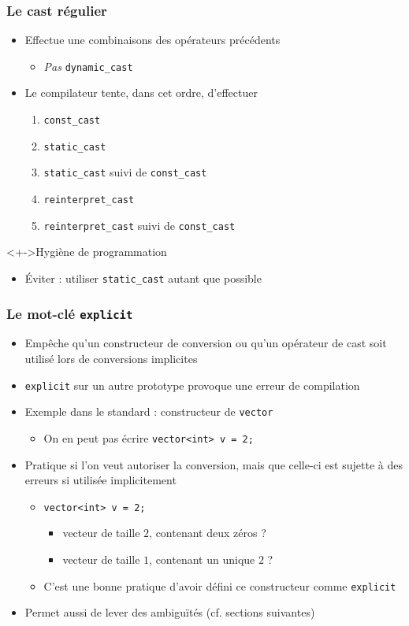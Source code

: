 \begin{frame}
\frametitle{Le cast régulier}
\begin{itemize}[<+->]
\item Effectue une combinaisons des opérateurs précédents
	\begin{itemize}
	\item \emph{Pas} \lstinline|dynamic_cast|
	\end{itemize}
\item Le compilateur tente, dans cet ordre, d'effectuer
	\begin{enumerate}
	\item \lstinline|const_cast|
	\item \lstinline|static_cast|
	\item \lstinline|static_cast| suivi de \lstinline|const_cast|
	\item \lstinline|reinterpret_cast|
	\item \lstinline|reinterpret_cast| suivi de \lstinline|const_cast|
	\end{enumerate}
\end{itemize}
\begin{block}<+->{Hygiène de programmation}
	\begin{itemize}
	\item Éviter : utiliser \lstinline|static_cast| autant que possible
	\end{itemize}
\end{block}
\end{frame}

\begin{frame}
\frametitle{Le mot-clé \texttt{explicit}}
\begin{itemize}[<+->]
\item Empêche qu'un constructeur de conversion ou qu'un opérateur de cast soit utilisé lors de conversions implicites
\item \lstinline|explicit| sur un autre prototype provoque une erreur de compilation
\item Exemple dans le standard : constructeur de \texttt{vector}
	\begin{itemize}
	\item On en peut pas écrire \lstinline|vector<int> v = 2;|
	\end{itemize}
\item Pratique si l'on veut autoriser la conversion, mais que celle-ci est sujette à des erreurs si utilisée implicitement
	\begin{itemize}
	\item \lstinline|vector<int> v = 2;|
		\begin{itemize}
		\item vecteur de taille $2$, contenant deux zéros ?
		\item vecteur de taille $1$, contenant un unique $2$ ?
		\end{itemize}
	\item C'est une bonne pratique d'avoir défini ce constructeur comme \lstinline|explicit|
	\end{itemize}
\item Permet aussi de lever des ambiguïtés (cf. sections suivantes)
\end{itemize}
\end{frame}

